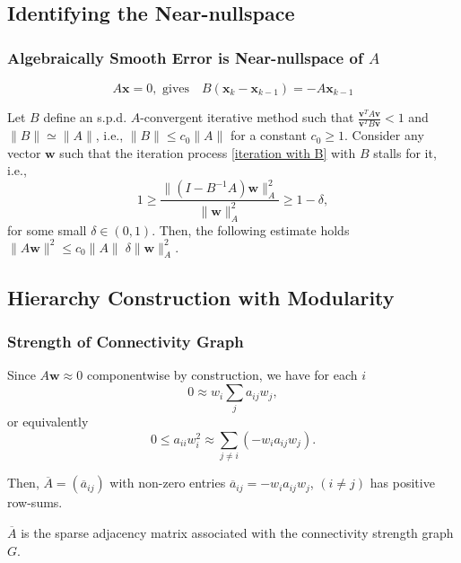 \documentclass[xcolor=dvipsnames]{beamer}
\def\bx{{\mathbf x}}
\def\bw{{\mathbf w}}
\def\bv{{\mathbf v}}
\begin{document}
\subsection{Identifying the Near-nullspace}
\begin{frame}
  \frametitle{Algebraically Smooth Error is Near-nullspace of $A$}

\begin{equation}\label{iteration with B}
  A \bx = 0, \text{ gives} \quad B (\bx_k -\bx_{k-1}) = - A \bx_{k-1}
\end{equation}

\begin{theorem}\label{theorem: near null component}
Let $B$ define an s.p.d. $A$-convergent iterative method such
  that $\frac{\bv^T A \bv}{\bv^T B \bv} < 1$ and $\|B\| \simeq \|A\|$, i.e., $\|B\| \le c_0 \|A\|$ for a constant $c_0 \ge 1$. 
Consider any vector $\bw$ such that the iteration process \eqref{iteration with B}
with $B$ stalls for it, i.e.,
\begin{equation}\label{stall inequality}
 1 \ge \frac{\|(I- B^{-1}A)\bw\|^2_A}{\|\bw\|^2_A} \ge 1-\delta,
\end{equation}
 for some small $\delta \in (0,1)$. Then, the following estimate holds $\|A\bw\|^2 \le c_0 \|A\|\;\delta \|\bw\|^2_A.$
\end{theorem}
\end{frame}

\subsection{Hierarchy Construction with Modularity}
\begin{frame}
  \frametitle{Strength of Connectivity Graph}
Since $A \bw \approx 0$ componentwise by construction, we have for each $i$
\begin{equation*}
    0 \approx w_i  \sum\limits_j a_{ij} w_j,
\end{equation*}
    or equivalently 
\begin{equation*}
    0 \le a_{ii} w^2_i \approx \sum\limits_{j\ne i} (-w_i a_{ij} w_j).
\end{equation*}

Then, ${\overline A} =({\overline a}_{ij})$ with non-zero entries ${\overline a}_{ij} = - w_i a_{ij} w_j$, $(i \not = j)$ has positive row-sums. 

  \vspace{1em}

  $\overline A$ is the sparse adjacency matrix associated with the connectivity strength graph $G$.
\end{frame}
\end{document}
